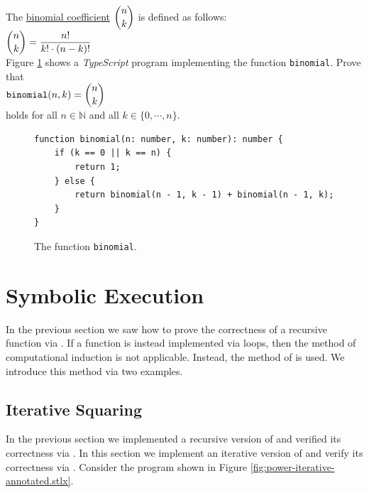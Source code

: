 \exerciseEng
The \href{https://en.wikipedia.org/wiki/Binomial_coefficient}{binomial coefficient} $\displaystyle {n \choose k}$ is defined as follows:
\\[0.2cm]
\hspace*{1.3cm}
$\displaystyle {n \choose k} = \frac{n!}{k! \cdot (n-k)!}$
\\[0.2cm]
Figure \ref{fig:binomial} shows a \textsl{TypeScript} program implementing the function \texttt{binomial}.  Prove
that 
\\[0.2cm]
\hspace*{1.3cm}
$\displaystyle \mathtt{binomial}(n, k) = {n \choose k}$
\\[0.2cm]
holds for all $n \in \mathbb{N}$ and all $k \in \{ 0, \cdots, n \}$. \eox

\begin{figure}[!ht]
\centering
\begin{verbatim}
function binomial(n: number, k: number): number {
    if (k == 0 || k == n) {
        return 1;
    } else {
        return binomial(n - 1, k - 1) + binomial(n - 1, k);
    }
}
\end{verbatim}
\vspace*{-0.3cm}
\caption{The function \texttt{binomial}.}
\label{fig:binomial}
\end{figure}



\section{Symbolic Execution}
In the previous section we saw how to prove the correctness of a recursive function via
.  If a function is instead implemented via loops,
then the method of computational induction is not applicable.   Instead, the method of 
  is used.
We introduce this method via two examples.

\subsection{Iterative Squaring}
In the previous section we implemented a recursive version of  and verified its
correctness via .  In this section we implement an iterative version of
 and verify its correctness via .
Consider the program shown in Figure \ref{fig:power-iterative-annotated.stlx}. 

